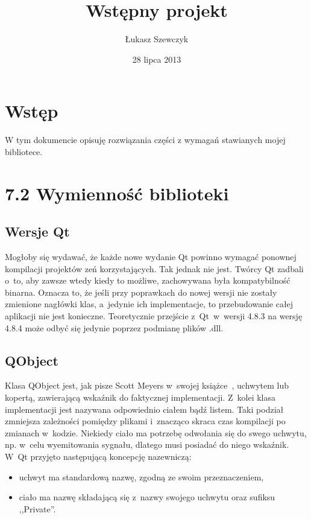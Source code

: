 \documentclass[11pt,twoside,a4paper,final]{llncs}
\begin{document}
\date{28 lipca 2013}
\title{Wstępny projekt}

\author{Łukasz Szewczyk}
\maketitle


\section{Wstęp}
W tym dokumencie opisuję rozwiązania części z wymagań stawianych mojej bibliotece.

\section{7.2 Wymienność biblioteki}
\subsection{Wersje Qt}
Mogłoby się wydawać, że każde nowe wydanie Qt powinno wymagać ponownej kompilacji projektów zeń korzystających. Tak jednak nie jest. Twórcy Qt zadbali o~to, aby zawsze wtedy kiedy to możliwe, zachowywana była kompatybilność binarna. Oznacza to, że jeśli przy poprawkach do nowej wersji nie zostały zmienione nagłówki klas, a~jedynie ich implementacje, to przebudowanie całej aplikacji nie jest konieczne. Teoretycznie przejście z~Qt~w~wersji 4.8.3 na wersję 4.8.4 może odbyć się jedynie poprzez podmianę plików .dll.

\subsection{QObject}
Klasa QObject jest, jak pisze Scott Meyers w~swojej książce~\cite{meyers}, uchwytem lub kopertą, zawierającą wskaźnik do faktycznej implementacji. Z~kolei klasa implementacji jest nazywana odpowiednio ciałem bądź listem. Taki podział zmniejsza zależności pomiędzy plikami i~znacząco skraca czas kompilacji po zmianach w~kodzie.
Niekiedy ciało ma potrzebę odwołania się do swego uchwytu, np. w~celu wyemitowania sygnału, dlatego musi posiadać do niego wskaźnik. W~Qt przyjęto następującą koncepcję nazewniczą:
\begin{itemize}
\item{uchwyt ma standardową nazwę, zgodną ze swoim przeznaczeniem,}
\item{ciało ma nazwę składającą się z~nazwy swojego uchwytu oraz sufiksu ,,Private''.}
\end{itemize}
\end{document}
